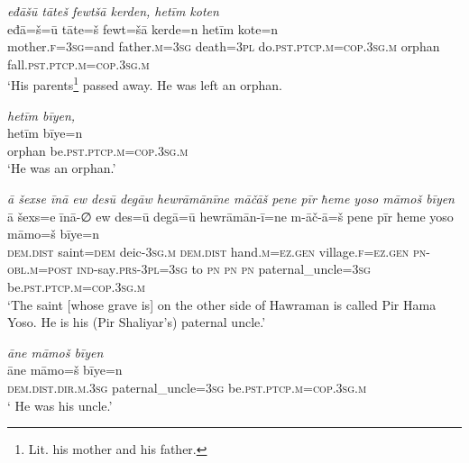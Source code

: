 \ea \label{ZP.4}
\textit{eđāšū tāteš fewtšā kerden, hetīm koten} \\ 
\gll eđā=š=ū tāte=š fewt=šā kerde=n hetīm kote=n \\ 
 mother\textsc{.f}\textsc{=3sg}=and father\textsc{.m}\textsc{=3sg} death\textsc{=3pl} do\textsc{.pst}\textsc{.ptcp}\textsc{.m}\textsc{=cop}\textsc{.3sg}\textsc{.m} orphan fall\textsc{.pst}\textsc{.ptcp}\textsc{.m}\textsc{=cop}\textsc{.3sg}\textsc{.m} \\ 
\glt `His parents\footnote{Lit. his mother and his father.} passed away. He was left an orphan.\\ 
\z 

\ea \label{ZP.5}
\textit{hetīm bīyen,} \\ 
\gll hetīm bīye=n \\ 
 orphan be\textsc{.pst}\textsc{.ptcp}\textsc{.m}\textsc{=cop}\textsc{.3sg}\textsc{.m} \\ 
\glt `He was an orphan.'
\z 
 
\ea \label{ZP.6}
\textit{ā šexse īnā ew desū degāw hewrāmānīne māčāš pene pīr ħeme yoso māmoš bīyen} \\ 
\gll ā šexs=e īnā-∅ ew des=ū degā=ū hewrāmān-ī=ne m-āč-ā=š pene pīr ħeme yoso māmo=š bīye=n \\ 
 \textsc{dem.dist} saint\textsc{=dem} deic\textsc{-3sg}\textsc{.m} \textsc{dem.dist} hand\textsc{.m}\textsc{\textsc{=ez.gen}} village\textsc{.f}\textsc{\textsc{=ez.gen}} \textsc{pn}\textsc{-obl}\textsc{.m}\textsc{=\textsc{post}} \textsc{ind-}say\textsc{.prs}\textsc{-3pl}\textsc{=3sg} to \textsc{pn} \textsc{pn} \textsc{pn} paternal\_uncle\textsc{=3sg} be\textsc{.pst}\textsc{.ptcp}\textsc{.m}\textsc{=cop}\textsc{.3sg}\textsc{.m} \\ 
\glt `The saint [whose grave is] on the other side of Hawraman is called Pir Hama Yoso. He is his (Pir Shaliyar’s) paternal uncle.'
\z 
 
\ea \label{ZP.7}
\textit{āne māmoš bīyen} \\ 
\gll āne māmo=š bīye=n \\ 
 \textsc{dem.dist}\textsc{.dir}\textsc{.m}\textsc{.3sg} paternal\_uncle\textsc{=3sg} be\textsc{.pst}\textsc{.ptcp}\textsc{.m}\textsc{=cop}\textsc{.3sg}\textsc{.m} \\ 
\glt ` He was his uncle.'
\z 
 
